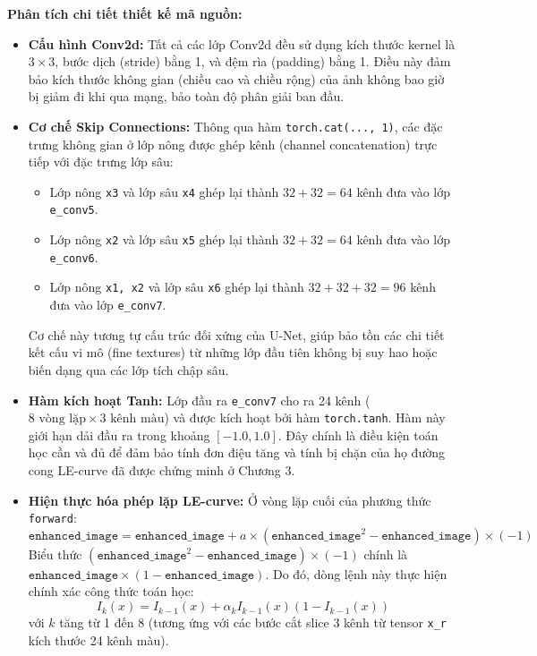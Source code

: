 \documentclass[a4paper]{article}
\begin{document}
\noindent \textbf{Phân tích chi tiết thiết kế mã nguồn:}
\begin{itemize}
    \item \textbf{Cấu hình Conv2d:} Tất cả các lớp Conv2d đều sử dụng kích thước kernel là $3 \times 3$, bước dịch (stride) bằng 1, và đệm rìa (padding) bằng 1. Điều này đảm bảo kích thước không gian (chiều cao và chiều rộng) của ảnh không bao giờ bị giảm đi khi qua mạng, bảo toàn độ phân giải ban đầu.
    \item \textbf{Cơ chế Skip Connections:} Thông qua hàm \texttt{torch.cat(..., 1)}, các đặc trưng không gian ở lớp nông được ghép kênh (channel concatenation) trực tiếp với đặc trưng lớp sâu:
    \begin{itemize}
        \item Lớp nông \texttt{x3} và lớp sâu \texttt{x4} ghép lại thành $32 + 32 = 64$ kênh đưa vào lớp \texttt{e\_conv5}.
        \item Lớp nông \texttt{x2} và lớp sâu \texttt{x5} ghép lại thành $32 + 32 = 64$ kênh đưa vào lớp \texttt{e\_conv6}.
        \item Lớp nông \texttt{x1, x2} và lớp sâu \texttt{x6} ghép lại thành $32 + 32 + 32 = 96$ kênh đưa vào lớp \texttt{e\_conv7}.
    \end{itemize}
    Cơ chế này tương tự cấu trúc đối xứng của U-Net, giúp bảo tồn các chi tiết kết cấu vi mô (fine textures) từ những lớp đầu tiên không bị suy hao hoặc biến dạng qua các lớp tích chập sâu.
    \item \textbf{Hàm kích hoạt Tanh:} Lớp đầu ra \texttt{e\_conv7} cho ra 24 kênh ($8 \text{ vòng lặp} \times 3 \text{ kênh màu}$) và được kích hoạt bởi hàm \texttt{torch.tanh}. Hàm này giới hạn dải đầu ra trong khoảng $[-1.0, 1.0]$. Đây chính là điều kiện toán học cần và đủ để đảm bảo tính đơn điệu tăng và tính bị chặn của họ đường cong LE-curve đã được chứng minh ở Chương 3.
    \item \textbf{Hiện thực hóa phép lặp LE-curve:} Ở vòng lặp cuối của phương thức \texttt{forward}:
    \begin{equation*}
        \texttt{enhanced\_image} = \texttt{enhanced\_image} + a \times (\texttt{enhanced\_image}^2 - \texttt{enhanced\_image}) \times (-1)
    \end{equation*}
    Biểu thức $(\texttt{enhanced\_image}^2 - \texttt{enhanced\_image}) \times (-1)$ chính là $\texttt{enhanced\_image} \times (1 - \texttt{enhanced\_image})$. Do đó, dòng lệnh này thực hiện chính xác công thức toán học:
    \begin{equation}
        I_k(x) = I_{k-1}(x) + \alpha_k I_{k-1}(x)(1 - I_{k-1}(x))
    \end{equation}
    với $k$ tăng từ 1 đến 8 (tương ứng với các bước cắt slice 3 kênh từ tensor \texttt{x\_r} kích thước 24 kênh màu).
\end{itemize}
\end{document}

